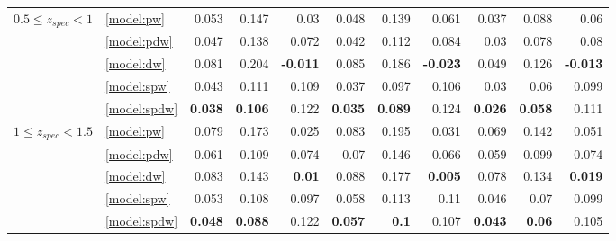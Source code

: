 \documentclass[fleqn,usenatbib]{mnras}
\begin{document}
\begin{table}
\begin{tabular}{llrrrrrrrrr}
\hline
            $0.5 \leq z_{spec} < 1$ & \ref{model:pw} &                0.053 &           0.147 &             0.03 &            0.048 &           0.139 &            0.061 &            0.037 &           0.088 &             0.06 \\
                              & \ref{model:pdw} &                0.047 &           0.138 &            0.072 &            0.042 &           0.112 &            0.084 &             0.03 &           0.078 &             0.08 \\
                              & \ref{model:dw} &                0.081 &           0.204 &  \textbf{-0.011} &            0.085 &           0.186 &  \textbf{-0.023} &            0.049 &           0.126 &  \textbf{-0.013} \\
                              & \ref{model:spw} &                0.043 &           0.111 &            0.109 &            0.037 &           0.097 &            0.106 &             0.03 &            0.06 &            0.099 \\
                              & \ref{model:spdw} &       \textbf{0.038} &  \textbf{0.106} &            0.122 &   \textbf{0.035} &  \textbf{0.089} &            0.124 &   \textbf{0.026} &  \textbf{0.058} &            0.111 \\
\hline
            $1 \leq z_{spec} < 1.5$ & \ref{model:pw} &                0.079 &           0.173 &            0.025 &            0.083 &           0.195 &            0.031 &            0.069 &           0.142 &            0.051 \\
                              & \ref{model:pdw} &                0.061 &           0.109 &            0.074 &             0.07 &           0.146 &            0.066 &            0.059 &           0.099 &            0.074 \\
                              & \ref{model:dw} &                0.083 &           0.143 &    \textbf{0.01} &            0.088 &           0.177 &   \textbf{0.005} &            0.078 &           0.134 &   \textbf{0.019} \\
                              & \ref{model:spw} &                0.053 &           0.108 &            0.097 &            0.058 &           0.113 &             0.11 &            0.046 &            0.07 &            0.099 \\
                              & \ref{model:spdw} &       \textbf{0.048} &  \textbf{0.088} &            0.122 &   \textbf{0.057} &    \textbf{0.1} &            0.107 &   \textbf{0.043} &   \textbf{0.06} &            0.105 \\

\end{tabular}
\end{table}
\end{document}

